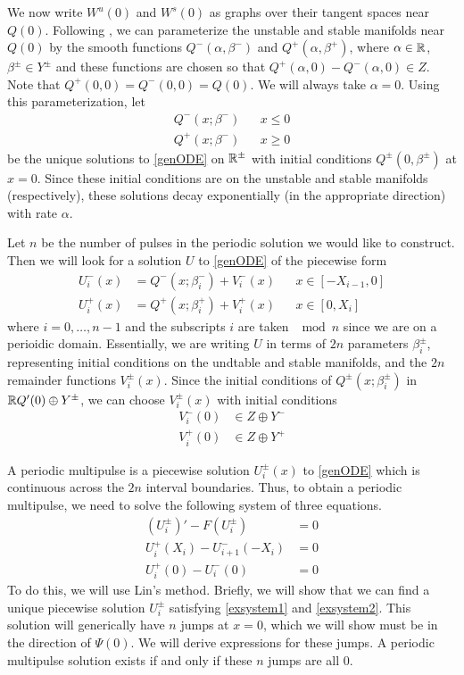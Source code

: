 \documentclass[thesis.tex]{subfiles}
\begin{document}
We now write $W^u(0)$ and $W^s(0)$ as graphs over their tangent spaces near $Q(0)$. Following \cite{Sandstede1997}, we can parameterize the unstable and stable manifolds near $Q(0)$ by the smooth functions $Q^-(\alpha, \beta^-)$ and $Q^+(\alpha, \beta^+)$, where $\alpha \in {\mathbb R}$, $\beta^\pm \in Y^\pm$ and these functions are chosen so that $Q^+(\alpha, 0) - Q^-(\alpha, 0) \in Z$. Note that $Q^+(0, 0) = Q^-(0, 0) = Q(0)$. We will always take $\alpha = 0$. Using this parameterization, let
\begin{align*}
Q^-(x; \beta^-) && x \leq 0 \\
Q^+(x; \beta^-) && x \geq 0
\end{align*}
be the unique solutions to \eqref{genODE} on ${\mathbb R}^\pm$ with initial conditions $Q^\pm(0, \beta^\pm)$ at $x = 0$. Since these initial conditions are on the unstable and stable manifolds (respectively), these solutions decay exponentially (in the appropriate direction) with rate $\alpha$.

Let $n$ be the number of pulses in the periodic solution we would like to construct. Then we will look for a solution $U$ to \eqref{genODE} of the piecewise form
\begin{equation}\label{Upiecewise}
\begin{aligned}
U_i^-(x) &= Q^-(x; \beta_i^-) + V_i^-(x) && x \in [-X_{i-1}, 0] \\
U_i^+(x) &= Q^+(x; \beta_i^+) + V_i^+(x) && x \in [0, X_i]
\end{aligned}
\end{equation}
where $i = 0, \dots, n-1$ and the subscripts $i$ are taken $\mod n$ since we are on a perioidic domain. Essentially, we are writing $U$ in terms of $2n$ parameters $\beta_i^\pm$, representing initial conditions on the undtable and stable manifolds, and the $2n$ remainder functions $V_i^\pm(x)$. Since the initial conditions of $Q^\pm(x; \beta_i^\pm)$ in ${\mathbb R} Q'(0) \oplus Y^\pm$, we can choose $V_i^\pm(x)$ with initial conditions
\begin{align*}
V_i^-(0) &\in Z \oplus Y^- \\
V_i^+(0) &\in Z \oplus Y^+
\end{align*}

A periodic multipulse is a piecewise solution $U_i^\pm(x)$ to \eqref{genODE} which is continuous across the $2n$ interval boundaries. Thus, to obtain a periodic multipulse, we need to solve the following system of three equations.
\begin{align}
(U_i^\pm)' - F(U_i^\pm) &= 0 \label{exsystem1} \\
U_i^+(X_i) - U_{i+1}^-(-X_i) &= 0 \label{exsystem2} \\
U_i^+(0) - U_i^-(0) &= 0 \label{exsystem3}
\end{align}
To do this, we will use Lin's method. Briefly, we will show that we can find a unique piecewise solution $U_i^\pm$ satisfying \eqref{exsystem1} and \eqref{exsystem2}. This solution will generically have $n$ jumps at $x = 0$, which we will show must be in the direction of $\Psi(0)$. We will derive expressions for these jumps. A periodic multipulse solution exists if and only if these $n$ jumps are all 0.
\end{document}
